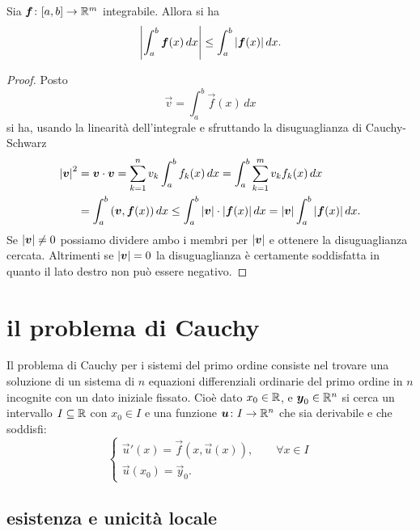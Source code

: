 \begin{theorem}\label{teo:tipo_jensen}
\label{th:stima_modulo_integrale}%
\mymark{*}%
Sia $\boldsymbol f\colon [a,b]\to {\mathbb R}^m$ integrabile. Allora si ha
\[
  {\left|\int_a^b \boldsymbol f(x)\, dx\right|} \le \int_a^b {\left|\boldsymbol f(x)\right|}\, dx.
\]
\end{theorem}
%
\begin{proof}
Posto
\[
 \vec v = \int_a^b \vec f(x)\, dx
\]
si ha, usando la linearità dell'integrale
e sfruttando la disuguaglianza di Cauchy-Schwarz
\begin{align*}
  {\left|\boldsymbol v\right|}^2
  &= \boldsymbol v \cdot \boldsymbol v
   = \sum_{k=1}^n v_k \int_a^b f_k(x)\, dx
   = \int_a^b \sum_{k=1}^m v_k f_k(x)\, dx \\
  &= \int_a^b {\left( \boldsymbol v, \boldsymbol f(x) \right)}\, dx
  \le \int_a^b {\left|\boldsymbol v\right|}\cdot {\left|\boldsymbol f(x)\right|}\, dx
  = {\left|\boldsymbol v\right|} \int_a^b {\left|\boldsymbol f(x)\right|}\, dx.
\end{align*}
Se ${\left|\boldsymbol v\right|}\neq 0$ possiamo dividere ambo i membri per ${\left|\boldsymbol v\right|}$ e
ottenere la disuguaglianza cercata.
Altrimenti se ${\left|\boldsymbol v\right|}=0$ la disuguaglianza è certamente soddisfatta in
quanto il lato destro non può essere negativo.
\end{proof}


\section{il problema di Cauchy}

Il problema di Cauchy
per i sistemi del primo ordine
consiste nel
trovare una soluzione di un sistema di $n$ equazioni differenziali ordinarie del primo ordine in $n$ incognite
con un dato iniziale fissato. Cioè dato $x_0\in {\mathbb R}$,
e $\boldsymbol y_0 \in {\mathbb R}^n$ si cerca un intervallo $I\subseteq {\mathbb R}$ con $x_0\in I$ e una funzione $\boldsymbol u \colon I\to {\mathbb R}^n$
che sia derivabile e che soddisfi:
\begin{equation}\label{eq:problema_cauchy}
\begin{cases}
 \vec u'(x) = \vec f(x, \vec u(x)), \qquad \forall x\in I\\
 \vec u(x_0) = \vec y_0.
\end{cases}
\end{equation}

\subsection{esistenza e unicità locale}

